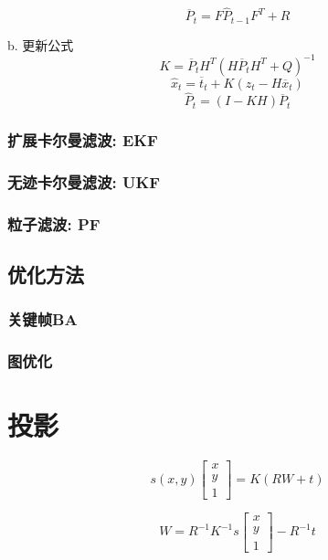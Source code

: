 \documentclass{ctexart}
\begin{document}
	\begin{equation}
	\overline{P}_t=F\hat{P}_{t-1}F^T+R
	\end{equation}
	\par {b. 更新公式}
	\begin{equation}
	K=\overline{P}_t H^T(H \overline{P}_t H^T + Q)^{-1}
	\end{equation}
	\begin{equation}
	\hat{x}_t=\overline{t}_t+K(z_t-H \overline{x}_t)
	\end{equation}
	\begin{equation}
	\hat{P}_t=(I-K H)\overline{P}_t
	\end{equation}
	\subsubsection*{扩展卡尔曼滤波: EKF}
	\subsubsection*{无迹卡尔曼滤波: UKF}
	\subsubsection*{粒子滤波: PF}
	\subsection{优化方法}
	\subsubsection{关键帧BA}
	\subsubsection{图优化}
	
	
	
	
	

	\section{投影}
	\begin{equation}
	s(x,y)
	\begin{bmatrix}
	x \\ y \\ 1
	\end{bmatrix}
	=K(RW+t)
	\end{equation}
	
	\begin{equation}
	W=R^{-1} K^{-1} s
	\begin{bmatrix}
	x \\ y \\ 1
	\end{bmatrix}
	- R^{-1} t
	\end{equation}
	
\end{document}
